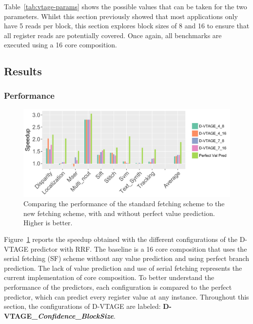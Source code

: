 Table~\ref{tab:vtage-params} shows the possible values that can be taken for the two parameters.
Whilst this section previously showed that most applications only have 5 reads per block, this section explores block sizes of 8 and 16 to ensure that all register reads are potentially covered. 
Once again, all benchmarks are executed using a 16 core composition.

\subsection{Results}

\subsubsection{Performance}

\begin{figure}[t]
    \centering
    \includegraphics[width=1\textwidth]{chapter3/graphics/vtage_speed2.pdf}
    \caption{Comparing the performance of the standard fetching scheme to the new fetching scheme, with and without perfect value prediction. Higher is better.}
    \label{fig:vtage_perf}
	\vspace{1em}
\end{figure}

Figure~\ref{fig:vtage_perf} reports the speedup obtained with the different configurations of the D-VTAGE predictor with RRF.
The baseline is a 16 core composition that uses the serial fetching (SF) scheme without any value prediction and using perfect branch prediction.
The lack of value prediction and use of serial fetching represents the current implementation of core composition.
To better understand the performance of the predictors, each configuration is compared to the perfect predictor, which can predict every register value at any instance.
Throughout this section, the configurations of D-VTAGE are labeled: \textbf{D-VTAGE\_\textit{Confidence}\_\textit{BlockSize}}.


